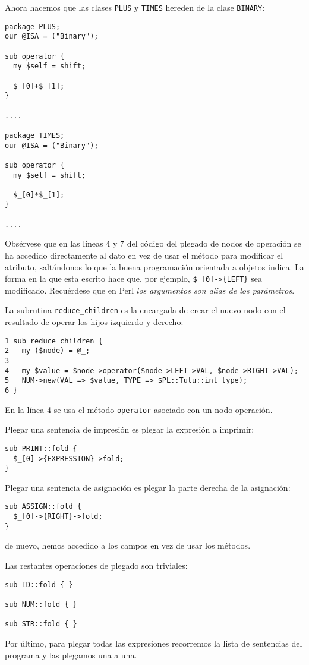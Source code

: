 Ahora hacemos que las clases \verb|PLUS| y \verb|TIMES| 
hereden de la clase \verb|BINARY|:
\begin{verbatim}
package PLUS;
our @ISA = ("Binary");

sub operator {
  my $self = shift;

  $_[0]+$_[1];
}

....

package TIMES;
our @ISA = ("Binary");

sub operator {
  my $self = shift;

  $_[0]*$_[1];
}

....
\end{verbatim}

Obsérvese que en las líneas 4 y 7 del código del plegado
de nodos de operación se ha accedido directamente 
al dato en vez de usar el método para modificar el atributo, 
saltándonos lo que la buena programación
orientada a objetos indica. La forma en la que esta escrito
hace que, por ejemplo, \verb|$_[0]->{LEFT}| sea modificado. 
Recuérdese que en Perl
\emph{los argumentos son alias de los parámetros}.

La subrutina \verb|reduce_children| es la encargada 
de crear el nuevo nodo con el resultado de operar los
hijos izquierdo y derecho:

\begin{verbatim}
1 sub reduce_children {
2   my ($node) = @_;
3 
4   my $value = $node->operator($node->LEFT->VAL, $node->RIGHT->VAL);
5   NUM->new(VAL => $value, TYPE => $PL::Tutu::int_type);
6 }
\end{verbatim}

En la línea 4 se usa el método \verb|operator| asociado 
con un nodo operación. 

Plegar una sentencia de impresión es plegar la expresión
a imprimir:
\begin{verbatim}
sub PRINT::fold {
  $_[0]->{EXPRESSION}->fold;
}
\end{verbatim}
Plegar una sentencia de asignación es plegar
la parte derecha de la asignación:
\begin{verbatim}
sub ASSIGN::fold {
  $_[0]->{RIGHT}->fold;
}
\end{verbatim}
de nuevo, hemos accedido a los campos en vez de usar los métodos.

Las restantes operaciones de plegado son triviales:
\begin{verbatim}
sub ID::fold { }

sub NUM::fold { }

sub STR::fold { }
\end{verbatim}
Por último, para plegar todas las expresiones
recorremos la lista de sentencias del programa
y las plegamos una a una.

